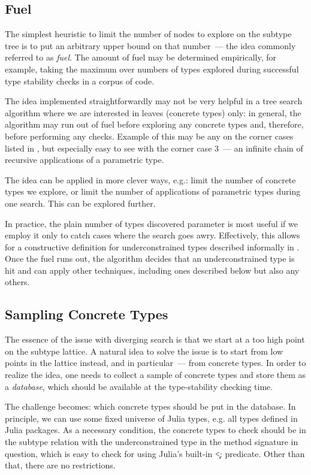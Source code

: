 \subsection{Fuel}

The simplest heuristic to limit the number of nodes to explore on the subtype tree
is to put an arbitrary upper bound on that number~--- the idea commonly referred
to as \emph{fuel}. The amount of fuel may be determined empirically, for
example, taking the maximum over numbers of types explored during successful type
stability checks in a corpus of code.

The idea implemented straightforwardly may not be very helpful in a tree search
algorithm where we are interested in leaves (concrete types) only: in general,
the algorithm may run out of fuel before exploring any concrete types and,
therefore, before performing any checks. Example of this may be any on the
corner cases listed in , but especially easy to see
with the corner case 3~--- an infinite chain of recursive applications of
a parametric type.

The idea can be applied in more clever ways, e.g.: limit the number of concrete
types we explore, or limit the number of applications of parametric types during
one search. This can be explored further.

In practice, the plain number of types discovered parameter is most useful if we employ it
only to catch cases where the search goes awry. Effectively, this allows for a
constructive definition for underconstrained types described informally in
. Once the fuel runs out, the algorithm decides
that an underconstrained type is hit and can apply other techniques, including
ones described below but also any others.

\subsection{Sampling Concrete Types}

The essence of the issue with diverging search is that we start at a too high
point on the subtype lattice. A natural idea to solve the issue is to start from
low points in the lattice instead, and in particular~--- from concrete types.
In order to realize the idea, one needs to collect a sample of concrete types
and store them as a \emph{database}, which should be available at the
type-stability checking time.

The challenge becomes: which concrete types should be put in the database. In
principle, we can use some fixed universe of Julia types, e.g. all types defined
in Julia packages. As a necessary condition, the concrete types to check should
be in the subtype relation with the underconstrained type in the method
signature in question, which is easy to check for using Julia's built-in \c{<:}
predicate. Other than that, there are no restrictions.

